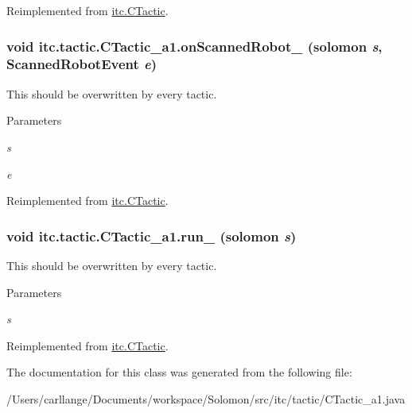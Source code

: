 Reimplemented from \hyperlink{classitc_1_1_c_tactic_a19cf73207948eff2c6db7d90fce8bd55}{itc.CTactic}.\hypertarget{classitc_1_1tactic_1_1_c_tactic__a1_aab5562fb9a1ed47924bdf4c1d6eb10de}{
\subsubsection[{onScannedRobot\_\-}]{\setlength{\rightskip}{0pt plus 5cm}void itc.tactic.CTactic\_\-a1.onScannedRobot\_\- ({\bf solomon} {\em s}, \/  ScannedRobotEvent {\em e})}}
\label{classitc_1_1tactic_1_1_c_tactic__a1_aab5562fb9a1ed47924bdf4c1d6eb10de}
This should be overwritten by every tactic. 
\begin{DoxyParams}{Parameters}
\item[{\em s}]\item[{\em e}]\end{DoxyParams}


Reimplemented from \hyperlink{classitc_1_1_c_tactic_a63a5a64ff30293061e37eca71fb77a96}{itc.CTactic}.\hypertarget{classitc_1_1tactic_1_1_c_tactic__a1_a83dba0cef825a91cd2818e3246a77a76}{
\subsubsection[{run\_\-}]{\setlength{\rightskip}{0pt plus 5cm}void itc.tactic.CTactic\_\-a1.run\_\- ({\bf solomon} {\em s})}}
\label{classitc_1_1tactic_1_1_c_tactic__a1_a83dba0cef825a91cd2818e3246a77a76}
This should be overwritten by every tactic. 
\begin{DoxyParams}{Parameters}
\item[{\em s}]\end{DoxyParams}


Reimplemented from \hyperlink{classitc_1_1_c_tactic_ae5f5c51a6e04d22bc298dbdec4080770}{itc.CTactic}.

The documentation for this class was generated from the following file:\begin{DoxyCompactItemize}
\item 
/Users/carllange/Documents/workspace/Solomon/src/itc/tactic/CTactic\_\-a1.java\end{DoxyCompactItemize}

